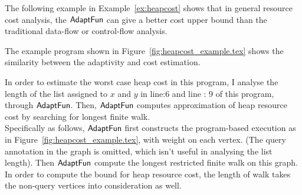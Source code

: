 The following example in Example~\ref{ex:heapcost} shows that in general 
resource cost analysis, the $\textsf{AdaptFun}$  can give a better cost upper bound than the traditional 
data-flow or control-flow analysis.
\begin{example}
  \label{ex:heapcost}
The example program shown in Figure~\ref{fig:heapcost_example.tex} shows the similarity
between the adaptivity and cost estimation.

In order to estimate the worst case heap cost in this program, I analyse the length 
of the list assigned to $x$ and $y$ in line:6 and line : 9 of this program, through $\textsf{AdaptFun}$.
Then,  $\textsf{AdaptFun}$ computes approximation
of heap resource cost by searching for longest finite walk.
\\
Specifically as follows, 
$\textsf{AdaptFun}$ first constructs the program-based execution as in Figure~\ref{fig:heapcost_example.tex},
with weight on each vertex. (The query annotation in the graph is omitted, which isn't useful in analysing the 
list length).
Then $\textsf{AdaptFun}$ compute the longest restricted finite walk on this graph.
\\
In order to compute the bound for heap resource cost, the length of walk takes the non-query vertices into consideration as 
well. 


\end{example}
